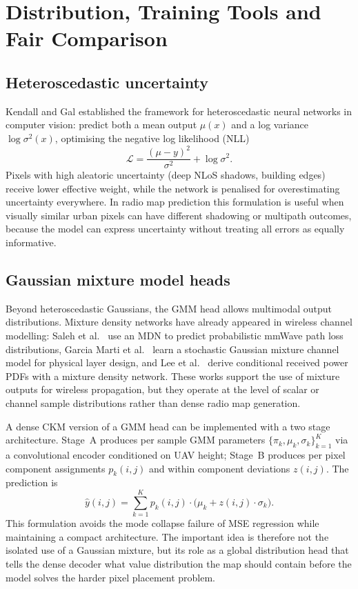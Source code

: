 \section{Distribution, Training Tools and Fair Comparison}
\label{sec:soa_distribution}

\subsection{Heteroscedastic uncertainty}

Kendall and Gal \cite{kendall2017uncertainties} established the framework for
heteroscedastic neural networks in computer vision: predict both a mean output
$\mu(x)$ and a log variance $\log \sigma^2(x)$, optimising the negative
log likelihood (NLL)
\begin{equation}
  \mathcal{L} = \frac{(\mu - y)^2}{\sigma^2} + \log \sigma^2.
\end{equation}
Pixels with high aleatoric uncertainty (deep NLoS shadows, building edges)
receive lower effective weight, while the network is penalised for
overestimating uncertainty everywhere. In radio map prediction this formulation
is useful when visually similar urban pixels can have different shadowing or
multipath outcomes, because the model can express uncertainty without treating
all errors as equally informative.

\subsection{Gaussian mixture model heads}

Beyond heteroscedastic Gaussians, the GMM head allows multimodal output
distributions.  Mixture density networks have already appeared in wireless
channel modelling: Saleh et al.\ \cite{saleh2021probabilistic} use an MDN to
predict probabilistic mmWave path loss distributions, Garcia Marti et al.\
\cite{garciamarti2020mixture} learn a stochastic Gaussian mixture channel
model for physical layer design, and Lee et al.\ \cite{lee2024timevarying}
derive conditional received power PDFs with a mixture density network.  These
works support the use of mixture outputs for wireless propagation, but they
operate at the level of scalar or channel sample distributions rather than
dense radio map generation.

A dense CKM version of a GMM head can be implemented with a two stage
architecture. Stage~A produces per sample GMM parameters
$\{\pi_k, \mu_k, \sigma_k\}_{k=1}^{K}$ via a convolutional encoder conditioned
on UAV height; Stage~B produces per pixel component assignments \(p_k(i,j)\)
and within component deviations \(z(i,j)\). The prediction is
\begin{equation}
  \hat{y}(i,j) = \sum_{k=1}^{K} p_k(i,j) \cdot \bigl(\mu_k + z(i,j) \cdot \sigma_k\bigr).
\end{equation}
This formulation avoids the mode collapse failure of MSE regression while
maintaining a compact architecture. The important idea is therefore not the
isolated use of a Gaussian mixture, but its role as a global distribution head
that tells the dense decoder what value distribution the map should contain
before the model solves the harder pixel placement problem.

